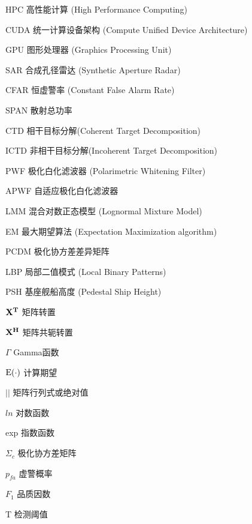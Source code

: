 \begin{denotation}[3cm]
\item[HPC] 高性能计算 (High Performance Computing)
\item[CUDA] 统一计算设备架构 (Compute Unified Device Architecture)
\item[GPU] 图形处理器 (Graphics Processing Unit)
\item[SAR] 合成孔径雷达 (Synthetic Aperture Radar)
\item[CFAR] 恒虚警率 (Constant False Alarm Rate)
\item[SPAN] 散射总功率
\item[CTD] 相干目标分解(Coherent Target Decomposition)
\item[ICTD] 非相干目标分解(Incoherent Target Decomposition)
\item[PWF] 极化白化滤波器 (Polarimetric Whitening Filter)
\item[APWF] 自适应极化白化滤波器
\item[LMM] 混合对数正态模型 (Lognormal Mixture Model)
\item[EM] 最大期望算法 (Expectation Maximization algorithm)
\item[PCDM] 极化协方差差异矩阵
\item[LBP] 局部二值模式 (Local Binary Patterns)
\item[PSH] 基座舰船高度 (Pedestal Ship Height)
\item[$\bf{X}^T$] 矩阵转置
\item[$\bf{X}^H$] 矩阵共轭转置
\item[$\Gamma$] Gamma函数 
\item[${\rm{E}}( \cdot )$] 计算期望
\item[$\left| {} \right|$] 矩阵行列式或绝对值
\item[$ln$] 对数函数
\item[exp] 指数函数  
\item[$\Sigma_c$]	极化协方差矩阵
\item[$p_{fa}$] 虚警概率
\item[$F_1$] 品质因数
\item[T] 检测阈值
\end{denotation}
